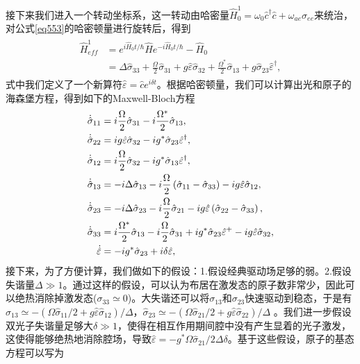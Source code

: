 接下来我们进入一个转动坐标系，这一转动由哈密量$\hat H_0^1= \omega_0\hat c^\dag \hat c + \omega_{ae}\sigma_{ee}$来统治，对公式\ref{eq553}的哈密顿量进行旋转后，得到
\begin{align}\label{eq555}
	\begin{split}
		\hat{ H}_{eff}^1 &= {e^{i{{\hat H}_0}t/\hbar }}\hat H{e^{ - i{{\hat H}_0}t/\hbar }} 
		- {{\hat H}_0}\\
		&= \Delta {{\hat \sigma }_{33}} + \frac{\Omega }{2}{{\hat \sigma }_{31} }
		+ g\hat \varepsilon {{\hat \sigma }_{32}} 
		+ \frac{{{\Omega ^*}}}{2}{{\hat \sigma }_{13}}
		+ g{{\hat \sigma }_{23}}{{\hat \varepsilon }^\dag },
	\end{split}
\end{align}
式中我们定义了一个新算符$\hat \varepsilon  = \hat c{e^{i\delta t}}$。根据哈密顿量，我们可以计算出光和原子的海森堡方程，得到如下的Maxwell-Bloch方程
\begin{align}\label{eq556}
	\begin{split}
		{\dot{\hat{ \sigma}} _{11}}  & =  i\frac{\Omega }{2}{\hat \sigma _{31}} 
		- i\frac{{{\Omega ^*}}}{2}{\hat \sigma _{13}},\\
		{\dot {\hat{ \sigma}} _{22}} & =  ig\hat \varepsilon {\hat \sigma _{32}} 
		- i{g^*}{\hat \sigma _{23}}{\hat \varepsilon ^\dag },\\
		{\dot {\hat{ \sigma}} _{12}} & =  i\frac{\Omega }{2}{\hat \sigma _{32}} 
		- i{g^*}{\hat \sigma _{13}}{\hat \varepsilon ^\dag },\\
		{\dot {\hat{ \sigma}} _{13}} & =- i\Delta {\hat \sigma _{13}} 
		- i\frac{\Omega }{2}\left( {{{\hat \sigma }_{11}} - {{\hat \sigma }_{33}}} \right) - ig\hat \varepsilon {\hat \sigma _{12}},\\
		{\dot {\hat{ \sigma}} _{23}} & =- i\Delta {\hat \sigma _{23}}-i\frac{\Omega }{2}{\hat \sigma _{21}}
		- ig\hat \varepsilon \left( {{{\hat \sigma }_{22}} 
			- {{\hat \sigma }_{33}}} \right),\\
		{\dot {\hat{ \sigma}} _{33}} & =  i\frac{{{\Omega ^{\rm{*}}}}}{2}{\hat \sigma _{13}}
		- i\frac{\Omega }{2}{\hat \sigma _{31}} 
		+ i{g^{\rm{*}}}{\hat \sigma _{23}}{\hat \varepsilon ^ + } 
		- ig\hat \varepsilon {\hat \sigma _{32}},\\
		\dot {\hat{ \varepsilon}}    & =- i{g^*}{\hat \sigma _{23}} + i\delta \hat \varepsilon , 
	\end{split}
\end{align}
接下来，为了方便计算，我们做如下的假设：1.假设经典驱动场足够的弱。2.假设失谐量$\Delta\gg 1$。通过这样的假设，可以认为布居在激发态的原子数非常少，因此可以绝热消除掉激发态(${\sigma _{33}} \simeq 0$)。大失谐还可以将$\sigma_{13}$和$\sigma_{23}$快速驱动到稳态，于是有${\hat \sigma _{13}} \simeq  - \left( {\Omega {{\hat \sigma }_{11}}/2 + g\hat \varepsilon {{\hat \sigma }_{12}}} \right)/\Delta $，${\hat \sigma _{23}} \simeq  - \left( {\Omega {{\hat \sigma }_{21}}/2 + g\hat \varepsilon {{\hat \sigma }_{22}}} \right)/\Delta $ 。我们进一步假设双光子失谐量足够大$\delta\gg 1$，使得在相互作用期间腔中没有产生显着的光子激发，这使得能够绝热地消除腔场，导致$\hat \varepsilon  =  - {g^*}\Omega {\hat \sigma _{21}}/2\Delta \delta $。基于这些假设，原子的基态方程可以写为
